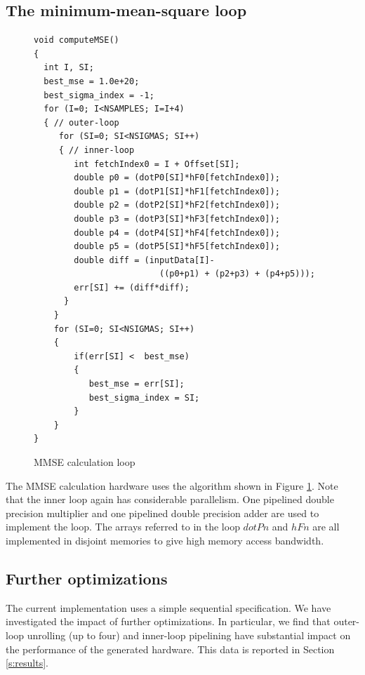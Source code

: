 \documentclass[runningheads]{llncs}
\begin{document}
\subsection{The minimum-mean-square loop} \label{sec:MMSE}

\begin{figure}
\begin{centering}
\begin{verbatim}
void computeMSE()
{
  int I, SI;
  best_mse = 1.0e+20;
  best_sigma_index = -1;
  for (I=0; I<NSAMPLES; I=I+4)
  { // outer-loop
     for (SI=0; SI<NSIGMAS; SI++)
     { // inner-loop
        int fetchIndex0 = I + Offset[SI]; 
        double p0 = (dotP0[SI]*hF0[fetchIndex0]);
        double p1 = (dotP1[SI]*hF1[fetchIndex0]);
        double p2 = (dotP2[SI]*hF2[fetchIndex0]);
        double p3 = (dotP3[SI]*hF3[fetchIndex0]);
        double p4 = (dotP4[SI]*hF4[fetchIndex0]);
        double p5 = (dotP5[SI]*hF5[fetchIndex0]);
        double diff = (inputData[I]-
                         ((p0+p1) + (p2+p3) + (p4+p5)));
        err[SI] += (diff*diff);
      }
    }
    for (SI=0; SI<NSIGMAS; SI++)
    {
        if(err[SI] <  best_mse)
        {
           best_mse = err[SI];
           best_sigma_index = SI;
        }
    }
}
\end{verbatim}
\end{centering}
\caption{MMSE calculation loop}
\label{fig:MMSE}
\end{figure}


The MMSE calculation hardware
uses the algorithm shown in Figure \ref{fig:MMSE}.
Note that the inner loop again has considerable parallelism.
One pipelined double precision multiplier and one
pipelined double precision adder are used to implement
the loop.  The arrays referred to in the loop
$dotPn$ and $hFn$ are all implemented in disjoint
memories to give high memory access bandwidth.



\subsection{Further optimizations}

The current implementation uses a simple sequential specification.
We have investigated the impact of
further optimizations.  In particular, we find that outer-loop
unrolling (up to four) and inner-loop pipelining 
have substantial impact on the performance of the generated hardware.
This data is reported in Section \ref{s:results}.
\end{document}

